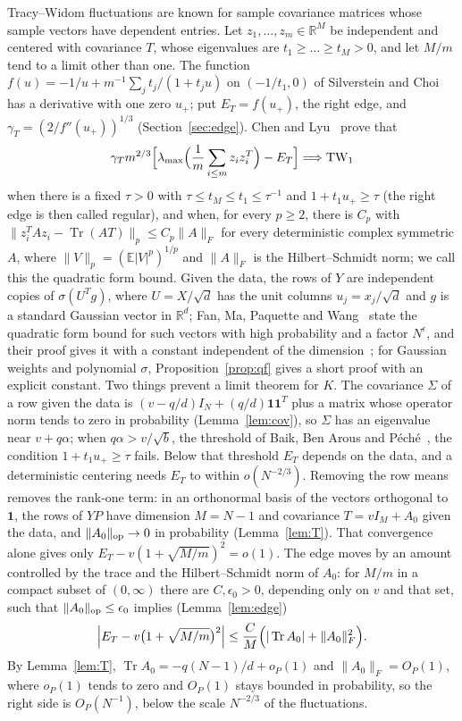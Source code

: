 \documentclass[11pt]{amsart}
\theoremstyle{remark}
\numberwithin{equation}{section}
\newcommand{\EE}{\mathbb{E}}
\newcommand{\RR}{\mathbb{R}}
\newcommand{\TW}{\mathrm{TW}_1}
\DeclareMathOperator{\Tr}{Tr}
\begin{document}
Tracy--Widom fluctuations are known for sample covariance matrices whose sample vectors have dependent entries. Let $z_1,\dots,z_m\in\RR^{M}$ be independent and centered with covariance $T$, whose eigenvalues are $t_1\ge\dots\ge t_M>0$, and let $M/m$ tend to a limit other than one. The function $f(u)=-1/u+m^{-1}\sum_{j}t_j/(1+t_ju)$ on $(-1/t_1,0)$ of Silverstein and Choi~\cite{SC} has a derivative with one zero $u_+$; put $E_T=f(u_+)$, the right edge, and $\gamma_T=(2/f''(u_+))^{1/3}$ (Section~\ref{sec:edge}). Chen and Lyu~\cite[Corollary~1.4]{CL} prove that
\[
\gamma_Tm^{2/3}\Bigl[\lambda_{\max}\Bigl(\frac1m\sum_{i\le m}z_iz_i^{T}\Bigr)-E_T\Bigr]\Longrightarrow\TW
\]
when there is a fixed $\tau>0$ with $\tau\le t_M\le t_1\le\tau^{-1}$ and $1+t_1u_+\ge\tau$ (the right edge is then called regular), and when, for every $p\ge2$, there is $C_p$ with $\|z_i^{T}Az_i-\Tr(AT)\|_p\le C_p\|A\|_F$ for every deterministic complex symmetric $A$, where $\|V\|_p=(\EE|V|^{p})^{1/p}$ and $\|A\|_F$ is the Hilbert--Schmidt norm; we call this the quadratic form bound. Given the data, the rows of $Y$ are independent copies of $\sigma(U^{T}g)$, where $U=X/\sqrt d$ has the unit columns $u_j=x_j/\sqrt d$ and $g$ is a standard Gaussian vector in $\RR^{d}$; Fan, Ma, Paquette and Wang~\cite[Proposition~2.17]{FMPW} state the quadratic form bound for such vectors with high probability and a factor $N^{\epsilon}$, and their proof gives it with a constant independent of the dimension~\cite[proof of Proposition~2.17, by Lemma~5.7]{FMPW}; for Gaussian weights and polynomial $\sigma$, Proposition~\ref{prop:qf} gives a short proof with an explicit constant. Two things prevent a limit theorem for $K$. The covariance $\Sigma$ of a row given the data is $(v-q/d)I_N+(q/d)\mathbf 1\mathbf 1^{T}$ plus a matrix whose operator norm tends to zero in probability (Lemma~\ref{lem:cov}), so $\Sigma$ has an eigenvalue near $v+q\alpha$; when $q\alpha>v/\sqrt b$, the threshold of Baik, Ben Arous and P\'ech\'e~\cite{BBP}, the condition $1+t_1u_+\ge\tau$ fails. Below that threshold $E_T$ depends on the data, and a deterministic centering needs $E_T$ to within $o(N^{-2/3})$. Removing the row means removes the rank-one term: in an orthonormal basis of the vectors orthogonal to $\mathbf 1$, the rows of $YP$ have dimension $M=N-1$ and covariance $T=vI_M+A_0$ given the data, and $\|A_0\|_{\rm op}\to0$ in probability (Lemma~\ref{lem:T}). That convergence alone gives only $E_T-v(1+\sqrt{M/m})^2=o(1)$. The edge moves by an amount controlled by the trace and the Hilbert--Schmidt norm of $A_0$: for $M/m$ in a compact subset of $(0,\infty)$ there are $C,\epsilon_0>0$, depending only on $v$ and that set, such that $\|A_0\|_{\rm op}\le\epsilon_0$ implies (Lemma~\ref{lem:edge})
\[
\Bigl|E_T-v\bigl(1+\sqrt{M/m}\bigr)^2\Bigr|\le\frac CM\Bigl(|\Tr A_0|+\|A_0\|_F^2\Bigr).
\]
By Lemma~\ref{lem:T}, $\Tr A_0=-q(N-1)/d+o_P(1)$ and $\|A_0\|_F=O_P(1)$, where $o_P(1)$ tends to zero and $O_P(1)$ stays bounded in probability, so the right side is $O_P(N^{-1})$, below the scale $N^{-2/3}$ of the fluctuations.
\end{document}
